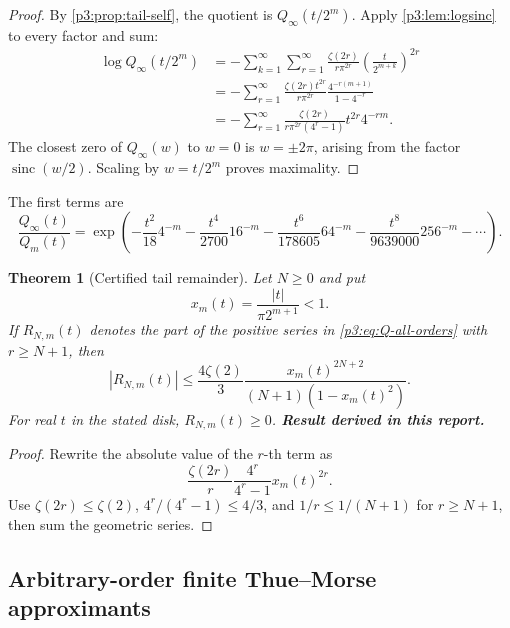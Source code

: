 \documentclass[11pt,oneside]{article}
\numberwithin{equation}{section}
\newtheorem{theorem}{Theorem}[section]
\theoremstyle{definition}
\theoremstyle{remark}
\newcommand{\sinc}{\operatorname{sinc}}
\newcommand{\newresult}{\textbf{Result derived in this report.}}
\begin{document}
\begin{proof}
By \cref{p3:prop:tail-self}, the quotient is $Q_\infty(t/2^m)$.  Apply
\cref{p3:lem:logsinc} to every factor and sum:
\begin{align*}
 \log Q_\infty(t/2^m)
 &=-\sum_{k=1}^{\infty}\sum_{r=1}^{\infty}
   \frac{\zeta(2r)}{r\pi^{2r}}
   \left(\frac{t}{2^{m+k}}\right)^{2r}\\
 &=-\sum_{r=1}^{\infty}\frac{\zeta(2r)t^{2r}}{r\pi^{2r}}
   \frac{4^{-r(m+1)}}{1-4^{-r}}\\
 &=-\sum_{r=1}^{\infty}
   \frac{\zeta(2r)}{r\pi^{2r}(4^r-1)}t^{2r}4^{-rm}.
\end{align*}
The closest zero of $Q_\infty(w)$ to $w=0$ is $w=\pm2\pi$, arising from the factor
$\sinc(w/2)$.  Scaling by $w=t/2^m$ proves maximality.
\end{proof}

The first terms are
\begin{equation}
 \frac{Q_\infty(t)}{Q_m(t)}
 =\exp\!\left(
 -\frac{t^2}{18}4^{-m}
 -\frac{t^4}{2700}16^{-m}
 -\frac{t^6}{178605}64^{-m}
 -\frac{t^8}{9639000}256^{-m}
 -\cdots\right).
 \label{p3:eq:Q-first-terms}
\end{equation}

\begin{theorem}[Certified tail remainder]
\label{p3:thm:Q-remainder}
Let $N\ge0$ and put
\begin{equation}
 x_m(t)=\frac{|t|}{\pi2^{m+1}}<1.
 \label{p3:eq:xmt}
\end{equation}
If $R_{N,m}(t)$ denotes the part of the positive series in
\eqref{p3:eq:Q-all-orders} with $r\ge N+1$, then
\begin{equation}
 \boxed{
 |R_{N,m}(t)|
 \le \frac{4\zeta(2)}{3}
 \frac{x_m(t)^{2N+2}}{(N+1)(1-x_m(t)^2)}.}
 \label{p3:eq:Q-remainder-bound}
\end{equation}
For real $t$ in the stated disk, $R_{N,m}(t)\ge0$.
\newresult
\end{theorem}

\begin{proof}
Rewrite the absolute value of the $r$-th term as
\[
 \frac{\zeta(2r)}{r}\frac{4^r}{4^r-1}x_m(t)^{2r}.
\]
Use $\zeta(2r)\le\zeta(2)$, $4^r/(4^r-1)\le4/3$, and
$1/r\le1/(N+1)$ for $r\ge N+1$, then sum the geometric series.
\end{proof}

\subsection{Arbitrary-order finite Thue--Morse approximants}
\end{document}
